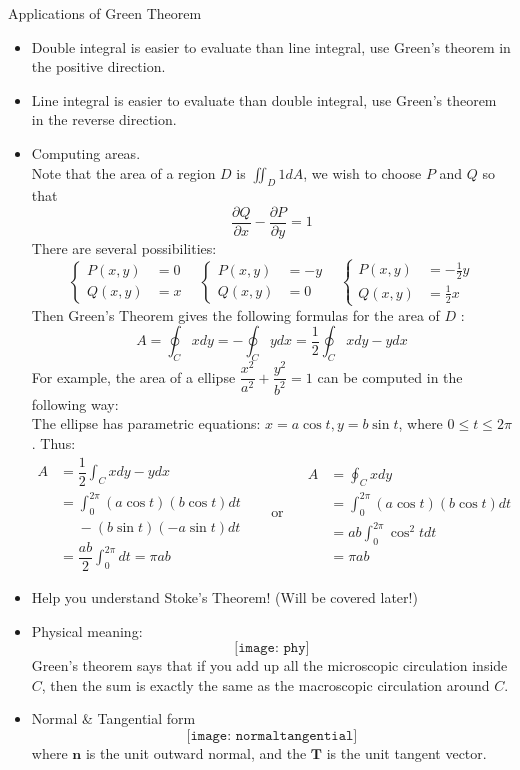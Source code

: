 \documentclass[10pt]{beamer}
\begin{document}
\begin{frame}[allowframebreaks]{Applications of Green Theorem}
\begin{itemize}
	\item Double integral is easier to evaluate than line integral, use Green's theorem in the positive direction.
	\item Line integral is easier to evaluate than double integral, use Green's theorem in the reverse direction.
	\item Computing areas.\\
	Note that the area of a region $D$ 	is $\iint_D 1dA$, we wish to choose $P$ and $Q$ so that $$\dfrac{\partial Q}{\partial x} - \dfrac{\partial P}{\partial y}  = 1$$
	There are several possibilities:
	\[
	\left\{
	\begin{aligned}
	P(x,y) &= 0\\
	Q(x,y) &=x
	\end{aligned}
	\right.~~~~
		\left\{
		\begin{aligned}
		P(x,y) &= -y\\
		Q(x,y) &=0
		\end{aligned}
		\right.
		~~~~
			\left\{
			\begin{aligned}
			P(x,y) &= -\frac{1}{2}y\\
			Q(x,y) &=\frac{1}{2}x
			\end{aligned}
			\right.
	\]
	Then Green's Theorem gives the following formulas for the area of $D$ :
	$$A = \oint_Cxdy = -\oint_Cydx = \dfrac{1}{2} \oint_Cxdy - ydx$$
	For example, the area of a ellipse $\dfrac{x^2}{a^2} + \dfrac{y^2}{b^2} = 1$ can be computed in the following way:\\
	The ellipse has parametric equations: $x=a\cos t, y=b\sin t$, where $0\leq t\leq 2\pi$. Thus:
\[
\begin{aligned}
A &= \dfrac{1}{2}\int_C	xdy - ydx
\\&= \int_0^{2\pi}(a\cos t)(b\cos t)dt 
\\&~~~~~~- (b\sin t)(-a\sin t)dt
\\&=\dfrac{ab}{2}\int_0^{2\pi}dt =\pi ab
\end{aligned}
~~~~~~~~\text{or}~~~~~~
\begin{aligned}
A &= \oint_C	xdy
\\&= \int_0^{2\pi}(a\cos t)(b\cos t)dt
\\&=ab\int_0^{2\pi}\cos^2 tdt 
\\&=\pi ab
\end{aligned}
\]
\item Help you understand Stoke's Theorem! (Will be covered later!)
\item Physical meaning:
$$\texttt{[image: phy]}$$
Green's theorem says that if you add up all the {\color{red}microscopic} circulation inside $C$,
then the sum is exactly the same as the {\color{blue}macroscopic} circulation around $C$.
\item Normal \& Tangential form
$$\texttt{[image: normaltangential]}$$
where $\mathbf{n}$ is the unit outward normal, and the $\mathbf{T}$ is the unit tangent vector.
\end{itemize}

\end{frame}
\end{document}
